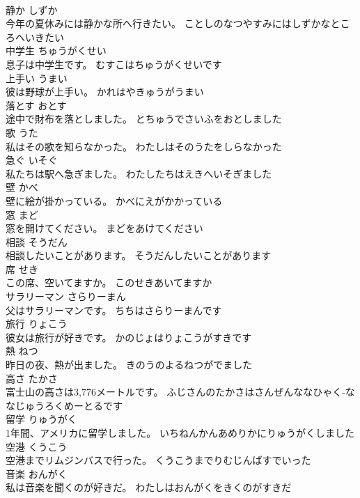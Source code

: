 \documentclass[8pt]{extreport}
\begin{document}
\begin{CJK}{UTF8}{min}
\\	静か	しずか	
\\	今年の夏休みには静かな所へ行きたい。	ことしのなつやすみにはしずかなところへいきたい	
\\	中学生	ちゅうがくせい	
\\	息子は中学生です。	むすこはちゅうがくせいです	
\\	上手い	うまい	
\\	彼は野球が上手い。	かれはやきゅうがうまい	
\\	落とす	おとす	
\\	途中で財布を落としました。	とちゅうでさいふをおとしました	
\\	歌	うた	
\\	私はその歌を知らなかった。	わたしはそのうたをしらなかった	
\\	急ぐ	いそぐ	
\\	私たちは駅へ急ぎました。	わたしたちはえきへいそぎました	
\\	壁	かべ	
\\	壁に絵が掛かっている。	かべにえがかかっている	
\\	窓	まど	
\\	窓を開けてください。	まどをあけてください	
\\	相談	そうだん	
\\	相談したいことがあります。	そうだんしたいことがあります	
\\	席	せき	
\\	この席、空いてますか。	このせきあいてますか	
\\	サラリーマン	さらりーまん	
\\	父はサラリーマンです。	ちちはさらりーまんです	
\\	旅行	りょこう	
\\	彼女は旅行が好きです。	かのじょはりょこうがすきです	
\\	熱	ねつ	
\\	昨日の夜、熱が出ました。	きのうのよるねつがでました	
\\	高さ	たかさ	
\\	富士山の高さは3,776メートルです。	ふじさんのたかさはさんぜんななひゃく-ななじゅうろくめーとるです	
\\	留学	りゅうがく	
\\	1年間、アメリカに留学しました。	いちねんかんあめりかにりゅうがくしました	
\\	空港	くうこう	
\\	空港までリムジンバスで行った。	くうこうまでりむじんばすでいった	
\\	音楽	おんがく	
\\	私は音楽を聞くのが好きだ。	わたしはおんがくをきくのがすきだ	

\end{CJK}
\end{document}
